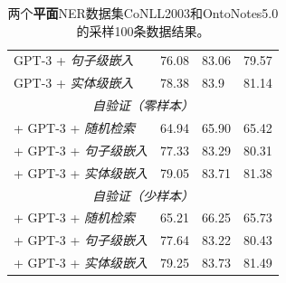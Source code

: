 \documentclass[supercite]{Experimental_Report}
\theoremstyle{definition}
\begin{document}
\begin{table}[th!]
{\begin{tabular}{llll}
        GPT-3 + \textit{句子级嵌入} & 76.08 & 83.06 & 79.57 \\
        GPT-3 + \textit{实体级嵌入} & 78.38 & 83.9 & 81.14 \\ \midrule
        \multicolumn{4}{c}{{\it 自验证（零样本）}} \\ \midrule
        + GPT-3 + \textit{随机检索} & 64.94 & 65.90 & 65.42 \\
        + GPT-3 + \textit{句子级嵌入} & 77.33 & 83.29 & 80.31 \\
        + GPT-3 + \textit{实体级嵌入} & 79.05 & 83.71 & 81.38 \\ \midrule
        \multicolumn{4}{c}{{\it 自验证（少样本）}} \\ \midrule
        + GPT-3 + \textit{随机检索} & 65.21 & 66.25 & 65.73 \\
        + GPT-3 + \textit{句子级嵌入} & 77.64 & 83.22 & 80.43 \\
        + GPT-3 + \textit{实体级嵌入} & 79.25 & 83.73 & 81.49 \\ \bottomrule
    \end{tabular}
    }
     \caption{两个\textbf{平面}NER数据集CoNLL2003和OntoNotes5.0的采样100条数据结果。}
    \label{tab:sample_ner_result}
\end{table}
\end{document}
